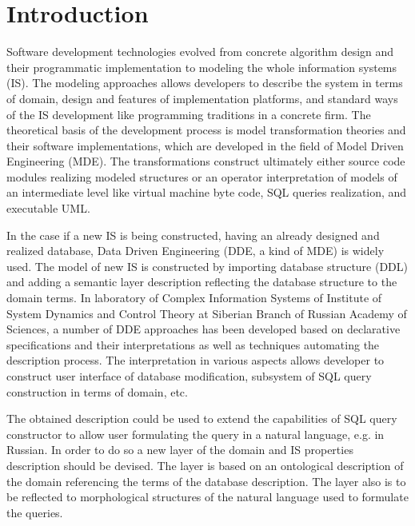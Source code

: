 \documentclass[conference]{IEEEtran}
\begin{document}
%
\IEEEpeerreviewmaketitle



\section{Introduction}
Software development technologies evolved from concrete algorithm design and their programmatic implementation to modeling the whole information systems (IS).  The modeling approaches allows developers to describe the system in terms of domain, design and features of implementation platforms, and standard ways of the IS development like programming traditions in a concrete firm.  The theoretical basis of the development process is model transformation theories and their software implementations, which are developed in the field of Model Driven Engineering (MDE).  The transformations construct ultimately either source code modules realizing modeled structures or an operator interpretation of models of an intermediate level like virtual machine byte code, SQL queries realization, and executable UML.

In the case if a new IS is being constructed, having an already designed and realized database, Data Driven Engineering (DDE, a kind of MDE) is widely used.  The model of new IS is constructed by importing database structure (DDL) and adding a semantic layer description reflecting the database structure to the domain terms.  In laboratory of Complex Information Systems of Institute of System Dynamics and Control Theory at Siberian Branch of Russian Academy of Sciences, a number of DDE approaches has been developed based on declarative specifications and their interpretations as well as techniques automating the description process.  The interpretation in various aspects allows developer to construct user interface of database modification, subsystem of SQL query construction in terms of domain, etc.

The obtained description could be used to extend the capabilities of SQL query constructor to allow user formulating the query in a natural language, e.g. in Russian.  In order to do so a new layer of the domain and IS properties description should be devised.  The layer is based on an ontological description of the domain referencing the terms of the database description.  The layer also is to be reflected to morphological structures of the natural language used to formulate the queries.
\end{document}
